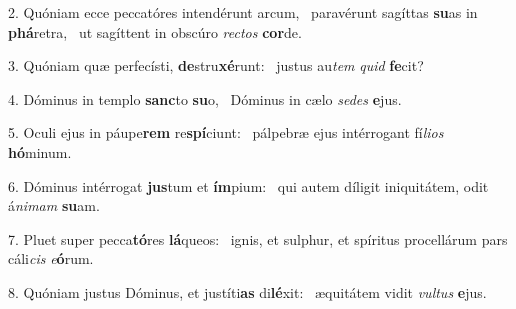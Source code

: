 2. Quóniam ecce peccatóres intendérunt arcum, \dag\  paravérunt sagíttas \textbf{su}as in \textbf{phá}retra, \ast\  ut sagíttent in obscúro \textit{rec}\textit{tos} \textbf{cor}de.\

3. Quóniam quæ perfecísti, \textbf{de}stru\textbf{xé}runt: \ast\  justus au\textit{tem} \textit{quid} \textbf{fe}cit?\

4. Dóminus in templo \textbf{sanc}to \textbf{su}o, \ast\  Dóminus in cælo \textit{se}\textit{des} \textbf{e}jus.\

5. Oculi ejus in páupe\textbf{rem} re\textbf{spí}ciunt: \ast\  pálpebræ ejus intérrogant fí\textit{li}\textit{os} \textbf{hó}minum.\

6. Dóminus intérrogat \textbf{jus}tum et \textbf{ím}pium: \ast\  qui autem díligit iniquitátem, odit á\textit{ni}\textit{mam} \textbf{su}am.\

7. Pluet super pecca\textbf{tó}res \textbf{lá}queos: \ast\  ignis, et sulphur, et spíritus procellárum pars cáli\textit{cis} \textit{e}\textbf{ó}rum.\

8. Quóniam justus Dóminus, et justíti\textbf{as} di\textbf{lé}xit: \ast\  æquitátem vidit \textit{vul}\textit{tus} \textbf{e}jus.\

